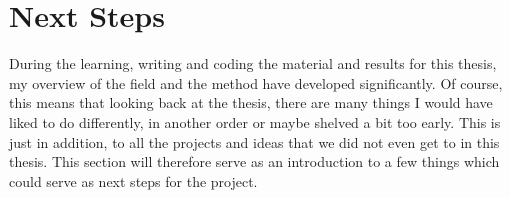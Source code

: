

\section{Next Steps}
During the learning, writing and coding the material and results for this thesis, my overview of the field and the method have developed significantly. Of course, this means that looking back at the thesis, there are many things I would have liked to do differently, in another order or maybe shelved a bit too early. This is just in addition, to all the projects and ideas that we did not even get to in this thesis. This section will therefore serve as an introduction to a few things which could serve as next steps for the project.

